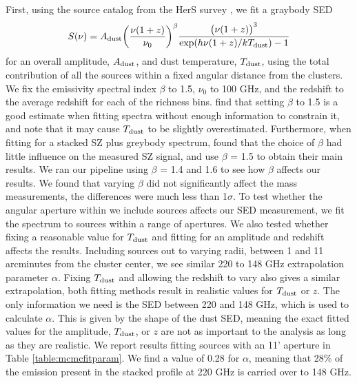 \documentclass[a4paper,fleqn,usenatbib]{mnras}
\begin{document}
First, using the source catalog from the HerS survey \citep{2014ApJS..210...22V}, we fit a graybody SED 
\begin{equation}
  \label{eq:dustSED}
  \centering
  S(\nu) = A_{\rm dust}  \bigg(\frac{\nu(1+z)}{\nu_0}\bigg)^{\beta} \frac{\big(\nu(1+z)\big)^{3} }{{\exp({h \nu (1+z) / k T_{\rm dust}}) - 1}}
\end{equation}
for an overall amplitude, $A_{\rm dust}$, and dust temperature, $T_{\rm dust}$, using the total contribution of all the sources within a fixed angular distance from the clusters. We fix the emissivity spectral index $\beta$ to 1.5, $\nu_0$ to 100 GHz, and the redshift to the average redshift for each of the richness bins. \cite{2014A&A...561A..86M} find that setting $\beta$ to 1.5 is a good estimate when fitting spectra without enough information to constrain it, and note that it may cause $T_{\rm dust}$ to be slightly overestimated. Furthermore, when fitting for a stacked SZ plus greybody spectrum, \cite{2017arXiv170901187E} found that the choice of $\beta$ had little influence on the measured SZ signal, and use $\beta$ = 1.5 to obtain their main results. We ran our pipeline using $\beta$ = 1.4 and 1.6 to see how $\beta$ affects our results. We found that varying $\beta$ did not significantly affect the mass measurements, the differences were much less than 1$\sigma$. To test whether the angular aperture within we include sources affects our SED measurement, we fit the spectrum to sources within a range of apertures.  We also tested whether fixing a reasonable value for $T_{\rm dust}$ and fitting for an amplitude and redshift affects the results. Including sources out to varying radii, between 1 and 11 arcminutes from the cluster center, we see similar 220 to 148 GHz extrapolation parameter $\alpha$. Fixing $T_{\rm dust}$ and allowing the redshift to vary also gives a similar extrapolation, both fitting methods result in realistic values for $T_{\rm dust}$ or $z$. The only information we need is the SED between 220 and 148 GHz, which is used to calculate $\alpha$. This is given by the shape of the dust SED, meaning the exact fitted values for the amplitude, $T_{\rm dust}$, or $z$ are not as important to the analysis as long as they are realistic. 
We report results fitting sources with an 11' aperture in Table \ref{table:mcmcfitparam}. We find a value of 0.28 for $\alpha$, meaning that 28\% of the emission present in the stacked profile at 220 GHz is carried over to 148 GHz.
\end{document}
